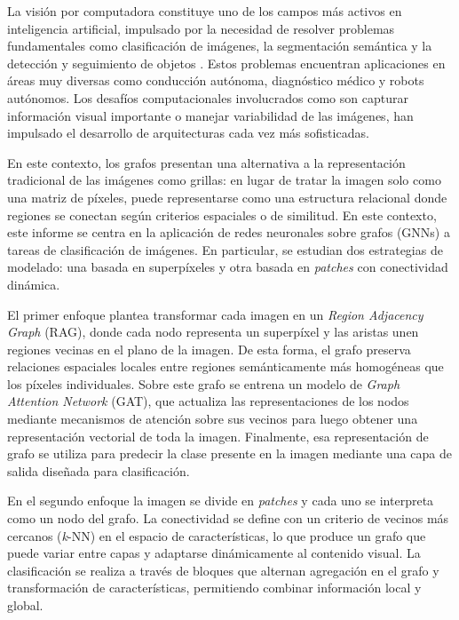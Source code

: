 \documentclass{article}
\begin{document}
La visión por computadora constituye uno de los campos más activos en inteligencia artificial, impulsado por la necesidad de resolver problemas fundamentales como clasificación de imágenes, la segmentación semántica y la detección y seguimiento de objetos \cite{graphs2022}. Estos problemas encuentran aplicaciones en áreas muy diversas como conducción autónoma, diagnóstico médico y robots autónomos. Los desafíos computacionales involucrados como son capturar información visual importante o manejar variabilidad de las imágenes, han impulsado el desarrollo de arquitecturas cada vez más sofisticadas.

En este contexto, los grafos presentan una alternativa a la representación tradicional de las imágenes como grillas: en lugar de tratar la imagen solo como una matriz de píxeles, puede representarse como una estructura relacional donde regiones se conectan según criterios espaciales o de similitud. En este contexto, este informe se centra en la aplicación de redes neuronales sobre grafos (GNNs) a tareas de clasificación de imágenes. En particular, se estudian dos estrategias de modelado: una basada en superpíxeles y otra basada en \textit{patches} con conectividad dinámica.

El primer enfoque \cite{avelar2020superpixel} plantea transformar cada imagen en un \textit{Region Adjacency Graph} (RAG), donde cada nodo representa un superpíxel y las aristas unen regiones vecinas en el plano de la imagen. De esta forma, el grafo preserva relaciones espaciales locales entre regiones semánticamente más homogéneas que los píxeles individuales. Sobre este grafo se entrena un modelo de \textit{Graph Attention Network} (GAT), que actualiza las representaciones de los nodos mediante mecanismos de atención sobre sus vecinos para luego obtener una representación vectorial de toda la imagen. Finalmente, esa representación de grafo se utiliza para predecir la clase presente en la imagen mediante una capa de salida diseñada para clasificación.

En el segundo enfoque \cite{han2022vision} la imagen se divide en \textit{patches} y cada uno se interpreta como un nodo del grafo. La conectividad se define con un criterio de vecinos más cercanos (\textit{k}-NN) en el espacio de características, lo que produce un grafo que puede variar entre capas y adaptarse dinámicamente al contenido visual. La clasificación se realiza a través de bloques que alternan agregación en el grafo y transformación de características, permitiendo combinar información local y global.
\end{document}
